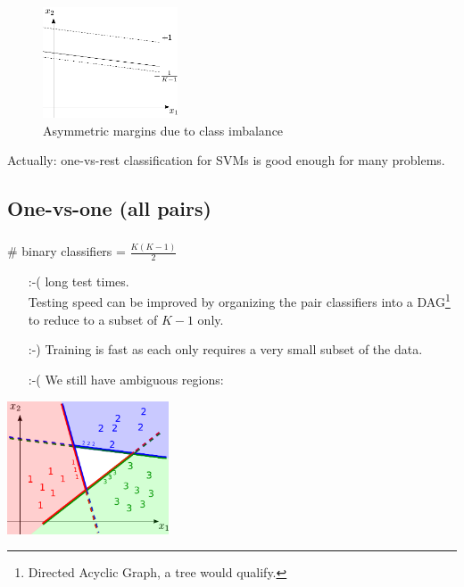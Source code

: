 \begin{frame}

\begin{figure}[h]
     \centering
	 \includegraphics[width=4cm]{img/asymmetric}
     \caption{Asymmetric margins due to class imbalance}
	 \label{fig:imbalance}
\end{figure}

Actually: one-vs-rest classification for SVMs is good enough for many problems.

    
\end{frame}

\subsection{One-vs-one (all pairs)}

\begin{frame}\frametitle{\subsecname}

\# binary classifiers = $\frac{K(K-1)}{2}$ 

\begin{itemize}
\item[:-(] long test times.\\
    Testing speed can be improved by organizing the pair classifiers into a DAG\footnote{Directed Acyclic Graph, a tree would qualify.} to reduce to a subset of $K-1$ only.
\item[:-)] Training is fast as each only requires a very small subset of the data. 
\item[:-(] We still have ambiguous regions:    
\end{itemize}

\begin{center}
	 \includegraphics[width=4.8cm]{img/3classes_onevsone_majority}
	 \label{fig:onevsone}
\end{center}
    
\end{frame}

